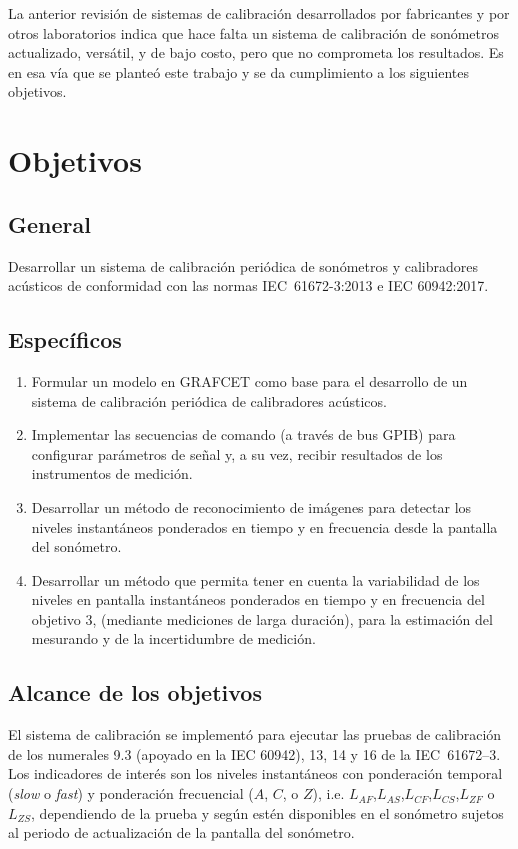 La anterior revisión de sistemas de calibración desarrollados por fabricantes y por otros laboratorios indica que hace
falta un sistema de calibración de sonómetros actualizado, versátil, y de bajo costo, pero que no comprometa los
resultados.
Es en esa vía que se planteó este trabajo y se da cumplimiento a los siguientes objetivos.


\section{Objetivos}

\subsection*{General}

Desarrollar un sistema de calibración periódica de sonómetros y calibradores acústicos de conformidad con las normas
\mbox{IEC 61672-3:2013} e {IEC 60942:2017}.
\vfill
\pagebreak

\subsection*{Específicos}

\begin{enumerate}
    \item Formular un modelo en GRAFCET como base para el desarrollo de un sistema de calibración periódica de
    calibradores acústicos.
    \item Implementar las secuencias de comando (a través de bus GPIB) para configurar parámetros de señal y, a su vez,
    recibir resultados de los instrumentos de medición.
    \item Desarrollar un método de reconocimiento de imágenes para detectar los niveles instantáneos ponderados en
    tiempo y en frecuencia desde la pantalla del sonómetro.
    \item Desarrollar un método que permita tener en cuenta la variabilidad de los niveles en pantalla instantáneos
    ponderados en tiempo y en frecuencia del objetivo 3, (mediante mediciones de larga duración), para la estimación
    del mesurando y de la incertidumbre de medición.
\end{enumerate}

\subsection*{Alcance de los objetivos}
El sistema de calibración se implementó para ejecutar las pruebas de calibración de los numerales 9.3 (apoyado en la
IEC 60942), 13, 14 y 16 de la \mbox{IEC 61672--3}.
Los indicadores de interés son los niveles instantáneos con ponderación temporal (\emph{slow} o \emph{fast}) y
ponderación frecuencial ($A$, $C$, o $Z$), i.e. $L_{AF}$,$L_{AS}$,$L_{CF}$,$L_{CS}$,$L_{ZF}$ o $L_{ZS}$, dependiendo
de la prueba y según estén disponibles en el sonómetro sujetos al periodo de actualización de la pantalla del sonómetro.


